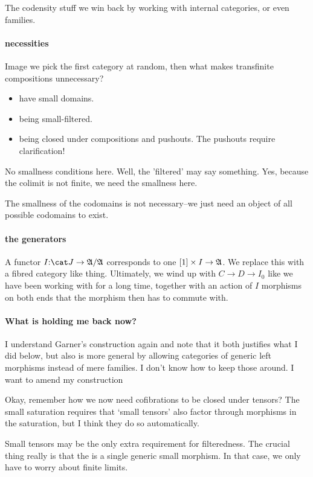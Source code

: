 \documentclass[csh.tex]{subfiles}
\begin{document}
The codensity stuff we win back by working with internal categories, or even families.

\paragraph{necessities}
Image we pick the first category at random, then what makes transfinite compositions unnecessary?
\begin{itemize}
\item have small domains.
\item being small-filtered.
\item being closed under compositions and pushouts. The pushouts require clarification!
\end{itemize}

No smallness conditions here. Well, the 'filtered' may say something.
Yes, because the colimit is not finite, we need the smallness here.

The smallness of the codomains is not necessary--we just need an object of all possible codomains to exist.

\paragraph{the generators}
A functor $I\of\cat J \to\ambient/\ambient$ corresponds to one $[1]\times I \to \mathfrak A$. We replace this with a fibred category like thing.
Ultimately, we wind up with $C\to D \to I_0$ like we have been working with for a long time, together with an action of $I$ morphisms on both ends that the morphism then has to commute with.

\paragraph{What is holding me back now?}
I understand Garner's construction again and note that it both justifies what I did below, but also is more general by allowing categories of generic left morphisms instead of mere families. I don't know how to keep those around. I want to amend my construction 

Okay, remember how we now need cofibrations to be closed under tensors? The small saturation requires that `small tensors' also factor through morphisms in the saturation, but I think they do so automatically.

Small tensors may be the only extra requirement for filteredness.
The crucial thing really is that the is a single generic small morphism. In that case, we only have to worry about finite limits.
\end{document}
